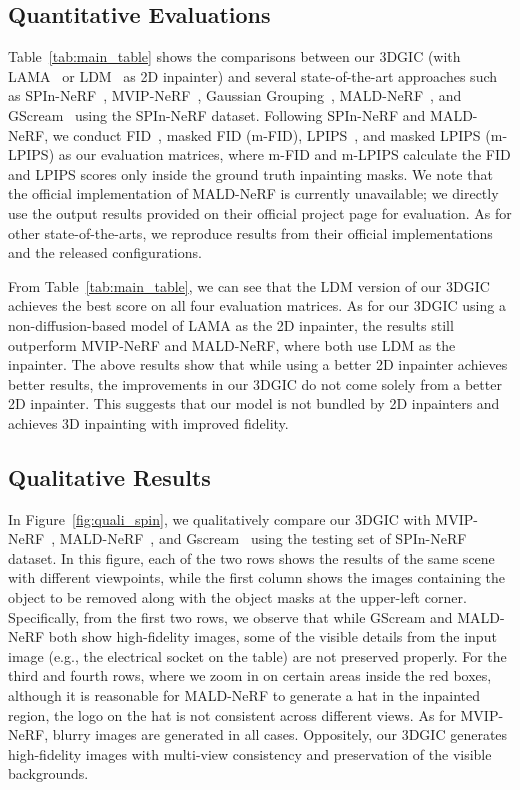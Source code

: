 \subsection{Quantitative Evaluations}
\label{sec:quant}
Table~\ref{tab:main_table} shows the comparisons between our 3DGIC (with LAMA~\cite{lama} or LDM~\cite{ldm} as 2D inpainter) and several state-of-the-art approaches such as SPIn-NeRF~\cite{mirzaei2023spin}, MVIP-NeRF~\cite{chen2024mvip}, Gaussian Grouping~\cite{ye2023gaussiangrouping}, MALD-NeRF~\cite{lin2024maldnerf}, and GScream~\cite{wang2024gscream} using the SPIn-NeRF dataset. Following SPIn-NeRF and MALD-NeRF, we conduct FID~\cite{heusel2017fid}, masked FID (m-FID), LPIPS~\cite{lpips}, and masked LPIPS (m-LPIPS) as our evaluation matrices, where m-FID and m-LPIPS calculate the FID and LPIPS scores only inside the ground truth inpainting masks. We note that the official implementation of MALD-NeRF is currently unavailable; we directly use the output results provided on their official project page for evaluation. As for other state-of-the-arts, we reproduce results from their official implementations and the released configurations.

From Table~\ref{tab:main_table}, we can see that the LDM version of our 3DGIC achieves the best score on all four evaluation matrices. As for our 3DGIC using a non-diffusion-based model of LAMA as the 2D inpainter, the results still outperform MVIP-NeRF and MALD-NeRF, where both use LDM as the inpainter. The above results show that while using a better 2D inpainter achieves better results, the improvements in our 3DGIC do not come solely from a better 2D inpainter. This suggests that our model is not bundled by 2D inpainters and achieves 3D inpainting with improved fidelity.



\subsection{Qualitative Results}
In Figure~\ref{fig:quali_spin}, we qualitatively compare our 3DGIC with MVIP-NeRF~\cite{chen2024mvip}, MALD-NeRF~\cite{lin2024maldnerf}, and Gscream~\cite{wang2024gscream} using the testing set of SPIn-NeRF dataset. In this figure, each of the two rows shows the results of the same scene with different viewpoints, while the first column shows the images containing the object to be removed along with the object masks at the upper-left corner. Specifically, from the first two rows, we observe that while GScream and MALD-NeRF both show high-fidelity images, some of the visible details from the input image (e.g., the electrical socket on the table) are not preserved properly. For the third and fourth rows, where we zoom in on certain areas inside the red boxes, although it is reasonable for MALD-NeRF to generate a hat in the inpainted region, the logo on the hat is not consistent across different views. As for MVIP-NeRF, blurry images are generated in all cases. Oppositely, our 3DGIC generates high-fidelity images with multi-view consistency and preservation of the visible backgrounds. 

